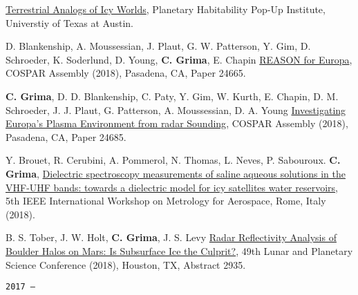 \begin{etaremune}
  \href{https://ig.utexas.edu/events/planetary-habitability/program-and-registration/week-3-habitability/}{Terrestrial
  Analogs of Icy Worlds}, Planetary Habitability Pop-Up Institute,
  Universtiy of Texas at Austin.
\item
  D. Blankenship, A. Moussessian, J. Plaut, G. W. Patterson, Y. Gim, D.
  Schroeder, K. Soderlund, D. Young, \textbf{C. Grima}, E. Chapin
  \href{}{REASON for Europa}, COSPAR Assembly (2018), Pasadena, CA,
  Paper 24665.
\item
  \textbf{C. Grima}, D. D. Blankenship, C. Paty, Y. Gim, W. Kurth, E.
  Chapin, D. M. Schroeder, J. J. Plaut, G. Patterson, A. Moussessian, D.
  A. Young \href{}{Investigating Europa's Plasma Environment from radar
  Sounding}, COSPAR Assembly (2018), Pasadena, CA, Paper 24685.
\item
  Y. Brouet, R. Cerubini, A. Pommerol, N. Thomas, L. Neves, P.
  Sabouroux. \textbf{C. Grima},
  \href{http://www.metroaerospace.org/files/MAS2018_Final.pdf}{Dielectric
  spectroscopy measurements of saline aqueous solutions in the VHF-UHF
  bands: towards a dielectric model for icy satellites water
  reservoirs}, 5th IEEE International Workshop on Metrology for
  Aerospace, Rome, Italy (2018).
\item
  B. S. Tober, J. W. Holt, \textbf{C. Grima}, J. S. Levy
  \href{https://www.hou.usra.edu/meetings/lpsc2018/pdf/2935.pdf}{Radar
  Reflectivity Analysis of Boulder Halos on Mars: Is Subsurface Ice the
  Culprit?}, 49th Lunar and Planetary Science Conference (2018),
  Houston, TX, Abstract 2935.

\hspace{-2em}\texttt{2017 ---}


\end{etaremune}
